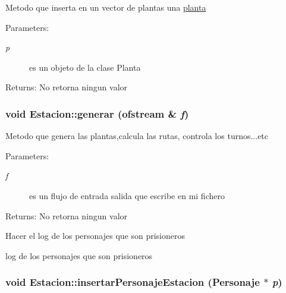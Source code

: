 Metodo que inserta en un vector de plantas una \hyperlink{classplanta}{planta} \begin{Desc}
\item[Parameters:]
\begin{description}
\item[{\em p}]es un objeto de la clase Planta \end{description}
\end{Desc}
\begin{Desc}
\item[Returns:]No retorna ningun valor \end{Desc}
\hypertarget{classEstacion_30787e042212e82f38bd54868a673744}{
\subsubsection[generar]{\setlength{\rightskip}{0pt plus 5cm}void Estacion::generar (ofstream \& {\em f})}}
\label{classEstacion_30787e042212e82f38bd54868a673744}


Metodo que genera las plantas,calcula las rutas, controla los turnos...etc \begin{Desc}
\item[Parameters:]
\begin{description}
\item[{\em f}]es un flujo de entrada salida que escribe en mi fichero \end{description}
\end{Desc}
\begin{Desc}
\item[Returns:]No retorna ningun valor \end{Desc}


Hacer el log de los personajes que son prisioneros

log de los personajes que son prisioneros \hypertarget{classEstacion_9cd8459a6f9c14168bd92edb88c68757}{
\subsubsection[insertarPersonajeEstacion]{\setlength{\rightskip}{0pt plus 5cm}void Estacion::insertarPersonajeEstacion ({\bf Personaje} $\ast$ {\em p})}}
\label{classEstacion_9cd8459a6f9c14168bd92edb88c68757}



